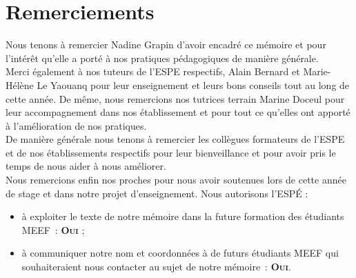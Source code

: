 \section*{Remerciements}
Nous tenons à remercier Nadine Grapin d'avoir encadré ce mémoire et pour l'intérêt qu'elle a porté à nos pratiques pédagogiques de manière générale.\\
Merci également à nos tuteurs de l'ESPE respectifs, Alain Bernard et Marie-Hélène Le Yaouanq pour leur enseignement et leurs bons conseils tout au long de cette année. De même, nous remercions nos tutrices terrain  Marine Doceul pour leur accompagnement dans nos établissement et pour tout ce qu'elles ont apporté à l'amélioration de nos pratiques.\\
De manière générale nous tenons à remercier les collègues formateurs de l'ESPE et de nos établissements respectifs pour leur bienveillance et pour avoir pris le temps de nous aider à nous améliorer.\\
Nous remercions enfin nos proches pour nous avoir soutenues lors de cette année de stage et dans notre projet d'enseignement.
\vfill
Nous autorisons l'ESPÉ :
\begin{itemize}
\item à exploiter le texte de notre mémoire dans la future formation des étudiants MEEF : \textbf{\textsc{Oui}} ;
\item à communiquer notre nom et coordonnées à de futurs étudiants MEEF qui souhaiteraient nous contacter au sujet de notre mémoire : \textbf{\textsc{Oui}}.
\end{itemize}
